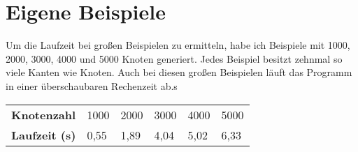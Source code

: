 \section {Eigene Beispiele}
Um die Laufzeit bei großen Beispielen zu ermitteln, habe ich Beispiele mit 1000, 2000, 3000, 4000 und 5000 Knoten generiert. Jedes Beispiel besitzt zehnmal so viele Kanten wie Knoten. Auch bei diesen großen Beispielen läuft das Programm in einer überschaubaren Rechenzeit ab.s 
\begin{table} [!h]
    \centering
    \begin{tabular}{l|lllll}
    \textbf{Knotenzahl}    & 1000 & 2000 & 3000 & 4000 & 5000 \\
    \textbf{Laufzeit (s)}  & 0,55 & 1,89 & 4,04 & 5,02 & 6,33 \\
    \end{tabular}
\end{table}
